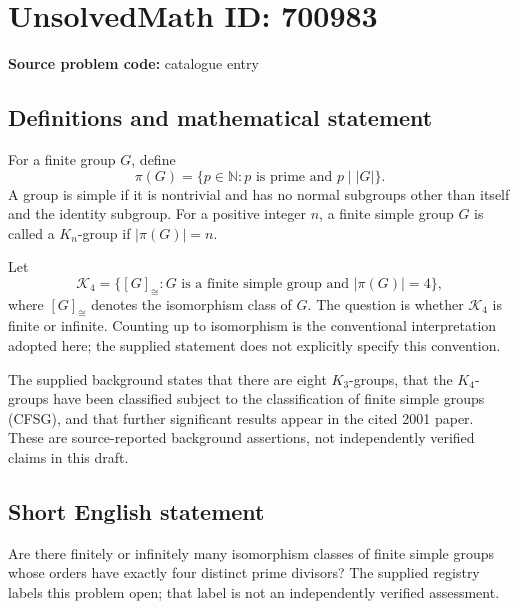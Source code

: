 \documentclass[11pt]{article}
\newcommand{\N}{\mathbb{N}}
\begin{document}
\section*{UnsolvedMath ID: 700983}
\textbf{Source problem code:} catalogue entry
\subsection{Definitions and mathematical statement}
For a finite group \(G\), define
\[
\pi(G)=\{p\in\N:p\text{ is prime and }p\mid |G|\}.
\]
A group is simple if it is nontrivial and has no normal subgroups other than itself and the identity subgroup. For a positive integer \(n\), a finite simple group \(G\) is called a \(K_n\)-group if \(|\pi(G)|=n\).

Let
\[
\mathcal K_4=\{[G]_{\cong}:G\text{ is a finite simple group and }|\pi(G)|=4\},
\]
where \([G]_{\cong}\) denotes the isomorphism class of \(G\). The question is whether \(\mathcal K_4\) is finite or infinite. Counting up to isomorphism is the conventional interpretation adopted here; the supplied statement does not explicitly specify this convention.

The supplied background states that there are eight \(K_3\)-groups, that the \(K_4\)-groups have been classified subject to the classification of finite simple groups (CFSG), and that further significant results appear in the cited 2001 paper. These are source-reported background assertions, not independently verified claims in this draft.
\subsection{Short English statement}
Are there finitely or infinitely many isomorphism classes of finite simple groups whose orders have exactly four distinct prime divisors? The supplied registry labels this problem open; that label is not an independently verified assessment.
\end{document}
